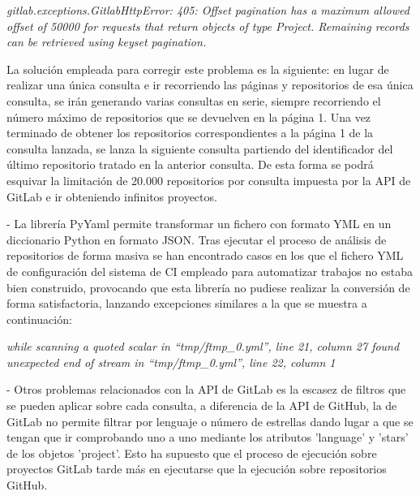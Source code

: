 \textit{gitlab.exceptions.GitlabHttpError: 405: Offset pagination has a maximum allowed offset of 50000 for requests that return objects of type Project. Remaining records can be retrieved using keyset pagination.}

La solución empleada para corregir este problema es la siguiente: en lugar de realizar una única consulta e ir recorriendo las páginas y repositorios de esa única consulta, se irán generando varias consultas en serie, siempre recorriendo el número máximo de repositorios que se devuelven en la página 1. Una vez terminado de obtener los repositorios correspondientes a la página 1 de la consulta lanzada, se lanza la siguiente consulta partiendo del identificador del último repositorio tratado en la anterior consulta. De esta forma se podrá esquivar la limitación de 20.000 repositorios por consulta impuesta por la API de GitLab e ir obteniendo infinitos proyectos.

- La librería PyYaml permite transformar un fichero con formato YML en un diccionario Python en formato JSON. Tras ejecutar el proceso de análisis de repositorios de forma masiva se han encontrado casos en los que el fichero YML de configuración del sistema de CI empleado para automatizar trabajos no estaba bien construido, provocando que esta librería no pudiese realizar la conversión de forma satisfactoria, lanzando excepciones similares a la que se muestra a continuación:

\textit{while scanning a quoted scalar in ``tmp/ftmp\_0.yml'', line 21, column 27 found unexpected end of stream in ``tmp/ftmp\_0.yml'', line 22, column 1}

- Otros problemas relacionados con la API de GitLab es la escasez de filtros que se pueden aplicar sobre cada consulta, a diferencia de la API de GitHub, la de GitLab no permite filtrar por lenguaje o número de estrellas dando lugar a que se tengan que ir comprobando uno a uno mediante los atributos 'language' y 'stars' de los objetos 'project'. Esto ha supuesto que el proceso de ejecución sobre proyectos GitLab tarde más en ejecutarse que la ejecución sobre repositorios GitHub.